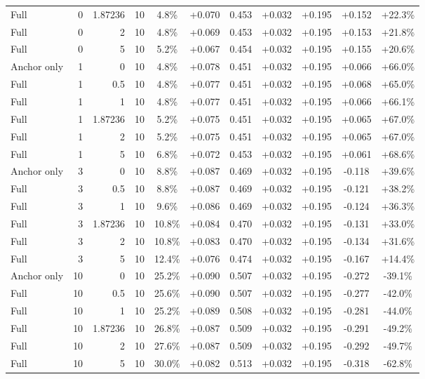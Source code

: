 \begin{table}[htbp]
\begin{tabular}{lrrrccccccc}
Full & 0 & 1.87236 & 10 & 4.8\% & +0.070 & 0.453 & +0.032 & +0.195 & +0.152 & +22.3\% \\
Full & 0 & 2 & 10 & 4.8\% & +0.069 & 0.453 & +0.032 & +0.195 & +0.153 & +21.8\% \\
Full & 0 & 5 & 10 & 5.2\% & +0.067 & 0.454 & +0.032 & +0.195 & +0.155 & +20.6\% \\
Anchor only & 1 & 0 & 10 & 4.8\% & +0.078 & 0.451 & +0.032 & +0.195 & +0.066 & +66.0\% \\
Full & 1 & 0.5 & 10 & 4.8\% & +0.077 & 0.451 & +0.032 & +0.195 & +0.068 & +65.0\% \\
Full & 1 & 1 & 10 & 4.8\% & +0.077 & 0.451 & +0.032 & +0.195 & +0.066 & +66.1\% \\
Full & 1 & 1.87236 & 10 & 5.2\% & +0.075 & 0.451 & +0.032 & +0.195 & +0.065 & +67.0\% \\
Full & 1 & 2 & 10 & 5.2\% & +0.075 & 0.451 & +0.032 & +0.195 & +0.065 & +67.0\% \\
Full & 1 & 5 & 10 & 6.8\% & +0.072 & 0.453 & +0.032 & +0.195 & +0.061 & +68.6\% \\
Anchor only & 3 & 0 & 10 & 8.8\% & +0.087 & 0.469 & +0.032 & +0.195 & -0.118 & +39.6\% \\
Full & 3 & 0.5 & 10 & 8.8\% & +0.087 & 0.469 & +0.032 & +0.195 & -0.121 & +38.2\% \\
Full & 3 & 1 & 10 & 9.6\% & +0.086 & 0.469 & +0.032 & +0.195 & -0.124 & +36.3\% \\
Full & 3 & 1.87236 & 10 & 10.8\% & +0.084 & 0.470 & +0.032 & +0.195 & -0.131 & +33.0\% \\
Full & 3 & 2 & 10 & 10.8\% & +0.083 & 0.470 & +0.032 & +0.195 & -0.134 & +31.6\% \\
Full & 3 & 5 & 10 & 12.4\% & +0.076 & 0.474 & +0.032 & +0.195 & -0.167 & +14.4\% \\
Anchor only & 10 & 0 & 10 & 25.2\% & +0.090 & 0.507 & +0.032 & +0.195 & -0.272 & -39.1\% \\
Full & 10 & 0.5 & 10 & 25.6\% & +0.090 & 0.507 & +0.032 & +0.195 & -0.277 & -42.0\% \\
Full & 10 & 1 & 10 & 25.2\% & +0.089 & 0.508 & +0.032 & +0.195 & -0.281 & -44.0\% \\
Full & 10 & 1.87236 & 10 & 26.8\% & +0.087 & 0.509 & +0.032 & +0.195 & -0.291 & -49.2\% \\
Full & 10 & 2 & 10 & 27.6\% & +0.087 & 0.509 & +0.032 & +0.195 & -0.292 & -49.7\% \\
Full & 10 & 5 & 10 & 30.0\% & +0.082 & 0.513 & +0.032 & +0.195 & -0.318 & -62.8\% \\

\end{tabular}
\end{table}
